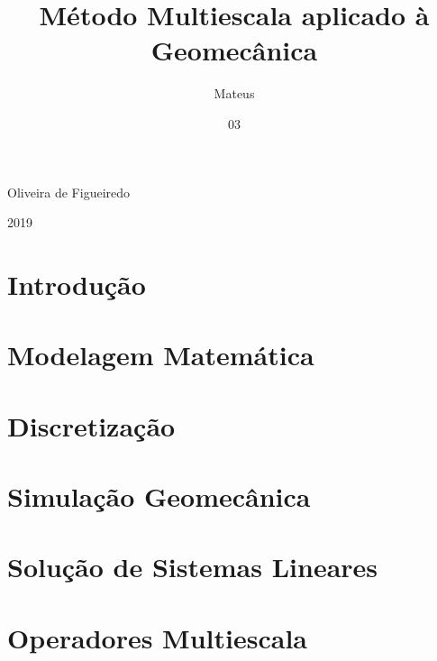 \documentclass[dsc,numbers]{coppe}
\begin{document}
  \title{Método Multiescala aplicado à Geomecânica}
  \author{Mateus}{Oliveira de Figueiredo}

  \date{03}{2019}

  \maketitle

  \frontmatter
  
  
  
  
  \tableofcontents
  \listoffigures
  \listoftables
  \printlosymbols
  \printloabbreviations

  \mainmatter
  
  \chapter{Introdução}

  \chapter{Modelagem Matemática} \label{ch:modelagem}
  

  \chapter{Discretização} \label{ch:discretizacao}

  \chapter{Simulação Geomecânica}\label{ch:geomecanica}
  

  \chapter{Solução de Sistemas Lineares}\label{ch:sistemas}
  

  \chapter{Operadores Multiescala}\label{ch:multiescala}
  
\end{document}
